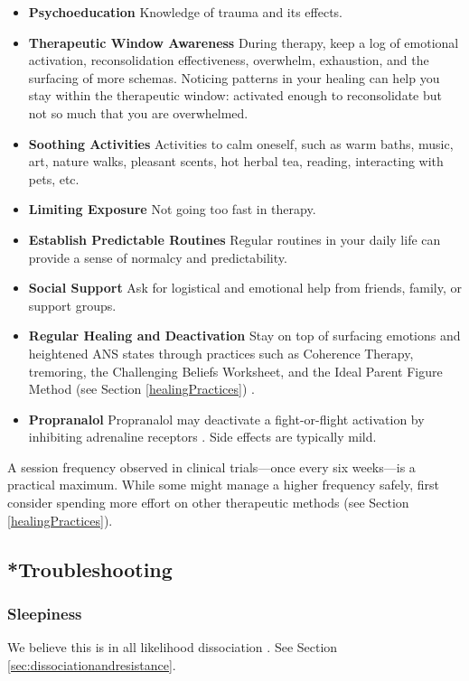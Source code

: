 \documentclass[12pt,letterpaper]{article}
\begin{document}
\begin{itemize}
\begin{itemize}
    \end{itemize}
    \item \textbf{Psychoeducation} Knowledge of trauma and its effects.
    \item \textbf{Therapeutic Window Awareness} During therapy, keep a log of emotional activation, reconsolidation effectiveness, overwhelm, exhaustion, and the surfacing of more schemas. Noticing patterns in your healing can help you stay within the therapeutic window: activated enough to reconsolidate but not so much that you are overwhelmed. 
    \item \textbf{Soothing Activities} Activities to calm oneself, such as warm baths, music, art, nature walks, pleasant scents, hot herbal tea, reading, interacting with pets, etc. 
    \item \textbf{Limiting Exposure} Not going too fast in therapy.  
    \item \textbf{Establish Predictable Routines} Regular routines in your daily life can provide a sense of normalcy and predictability.
    \item \textbf{Social Support} Ask for logistical and emotional help from friends, family, or support groups.
    \item \textbf{Regular Healing and Deactivation} Stay on top of surfacing emotions and heightened ANS states through practices such as Coherence Therapy, tremoring, the Challenging Beliefs Worksheet, and the Ideal Parent Figure Method (see Section \ref{healingPractices}) \cite{brownAttachmentDisturbances}.
    \item \textbf{Propranalol} Propranalol may deactivate a fight-or-flight activation by inhibiting adrenaline receptors \cite{steenenPropranalol}. Side effects are typically mild.
\end{itemize}

A session frequency observed in clinical trials—once every six weeks—is a practical maximum. While some might manage a higher frequency safely, first consider spending more effort on other therapeutic methods (see Section \ref{healingPractices}).
\subsection{*Troubleshooting}
\subsubsection{Sleepiness}
We believe this is in all likelihood dissociation \cite{kozlowskaDefenseCascade}. See Section \ref{sec:dissociationandresistance}.
\end{document}
